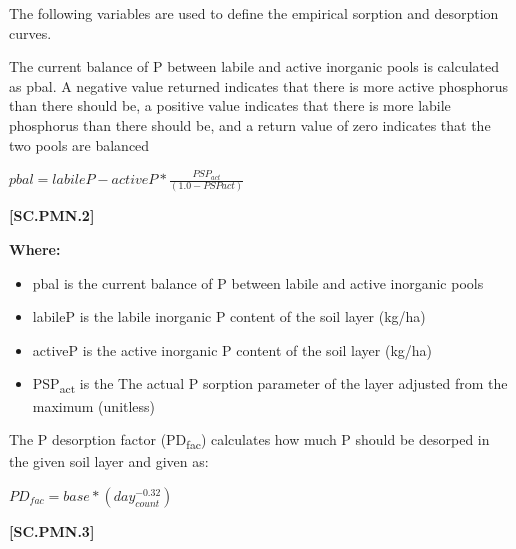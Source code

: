 The following variables are used to define the empirical sorption and desorption curves.
\vspace{0.2cm}

The current balance of P between labile and active inorganic pools is calculated as pbal. A negative value returned indicates that there is more active phosphorus than there should be, a positive value indicates that there is more labile phosphorus than there should be, and a return value of zero indicates that the two pools are balanced
            \vspace{0.5cm}

    \begin{center}
\(pbal = labileP - activeP * \frac{PSP_{act}}{(1.0 - PSPact)}\)
    \end{center}
        \vspace{0.5cm} 
    
            {\raggedleft \textbf{[SC.PMN.2]}\par}
            \vspace{0.5cm}

        \textbf{Where:}
            
        \begin{itemize}
            \item pbal is the current balance of P between labile and active inorganic pools
            \item labileP is the labile inorganic P content of the soil layer (kg/ha)
            \item activeP is the active inorganic P content of the soil layer (kg/ha)
            \item PSP\textsubscript{act} is the The actual P sorption parameter of the layer adjusted from the maximum (unitless)
        \end{itemize}
        \vspace{0.5cm}

The P desorption factor (PD\textsubscript{fac}) calculates how much P should be desorped in the given soil layer and given as:
            \vspace{0.5cm}

    \begin{center}
\(PD_{fac} = base *(day_{count}^{-0.32})\)
    \end{center}
        \vspace{0.5cm} 
    
            {\raggedleft \textbf{[SC.PMN.3]}\par}
            \vspace{0.5cm}

